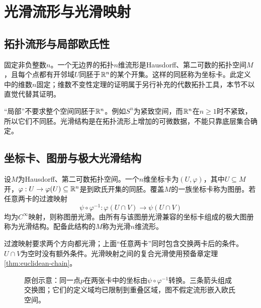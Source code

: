 \chapter{光滑流形与光滑映射}
\label{ch:03-manifolds}



\section{拓扑流形与局部欧氏性}
\begin{definition}[拓扑流形]
固定非负整数$n$。一个无边界的拓扑$n$维流形是Hausdorff、第二可数的拓扑空间$M$，且每个点都有开邻域$U$同胚于$\mathbb{R}^n$的某个开集。这样的同胚称为坐标卡。此定义中的维数$n$固定；维数不变性定理的证明属于另行补充的代数拓扑工具，本节不以直觉代替其证明。
\end{definition}
“局部”不要求整个空间同胚于$\mathbb{R}^n$。例如$S^n$为紧致空间，而$\mathbb{R}^n$在$n\geq1$时不紧致，所以它们不同胚。光滑结构是在拓扑流形上增加的可微数据，不能只靠底层集合确定。

\section{坐标卡、图册与极大光滑结构}
\begin{definition}[光滑流形]
设$M$为Hausdorff、第二可数拓扑空间。一个$n$维坐标卡为$(U,\varphi)$，其中$U\subseteq M$开，$\varphi:U\to\varphi(U)\subseteq\mathbb{R}^n$是到欧氏开集的同胚。覆盖$M$的一族坐标卡称为图册。若任意两卡的过渡映射
\[
\psi\circ\varphi^{-1}:\varphi(U\cap V)\longrightarrow\psi(U\cap V)
\]
均为$C^\infty$映射，则称图册光滑。由所有与该图册光滑兼容的坐标卡组成的极大图册称为光滑结构。配备此结构的$M$称为光滑$n$维流形。
\end{definition}
过渡映射要求两个方向都光滑；上面“任意两卡”同时包含交换两卡后的条件。$U\cap V$为空时没有额外条件。光滑映射之间的复合光滑使用预备章定理\ref{thm:euclidean-chain}。
\begin{figure}[htbp]
\centering

\caption{原创示意：同一点$p$在两张卡中的坐标由$\psi\circ\varphi^{-1}$转换。三条箭头组成交换图；它们的定义域均已限制到重叠区域，图不假定流形嵌入欧氏空间。}
\label{fig:atlas-transition}
\end{figure}

